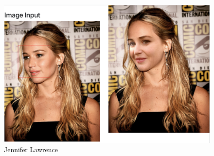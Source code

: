 




\begin{figure}[t]
    \centering
    \includegraphics[width=\linewidth]{Screen Shot 2022-05-09 at 4.06.05 PM.png}
    \caption{Jennifer Lawrence}
    \label{fig:result1}
\end{figure}


